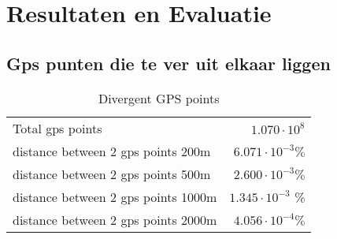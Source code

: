 \chapter{Resultaten en Evaluatie}

\section{Gps punten die te ver uit elkaar liggen}

\begin{table}[H]
    \centering
    \caption{Divergent GPS points}\label{tab:outerDistance}
    \begin{tabular}{lr}
        \toprule
        {}                                     &                           \\
        \midrule
        Total gps points                       & $1.070 \cdot 10^8$        \\
        distance between 2 gps points \> 200m  & $6.071 \cdot  10^{-3} \%$ \\
        distance between 2 gps points \> 500m  & $2.600 \cdot 10^{-3} \%$  \\
        distance between 2 gps points \> 1000m & $1.345 \cdot 10^{-3}$ \%  \\
        distance between 2 gps points \> 2000m & $4.056 \cdot 10^{-4} \%$  \\
        \bottomrule
    \end{tabular}
\end{table}

%  

